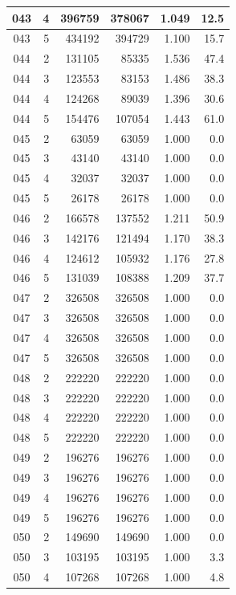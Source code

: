 \begin{longtable}{|c|r|r|r|r|r|}
\hline
043 & 4 & 396759 & 378067 & 1.049 & 12.5 \\
\hline
043 & 5 & 434192 & 394729 & 1.100 & 15.7 \\
\hline
044 & 2 & 131105 & 85335 & 1.536 & 47.4 \\
\hline
044 & 3 & 123553 & 83153 & 1.486 & 38.3 \\
\hline
044 & 4 & 124268 & 89039 & 1.396 & 30.6 \\
\hline
044 & 5 & 154476 & 107054 & 1.443 & 61.0 \\
\hline
045 & 2 & 63059 & 63059 & 1.000 & 0.0 \\
\hline
045 & 3 & 43140 & 43140 & 1.000 & 0.0 \\
\hline
045 & 4 & 32037 & 32037 & 1.000 & 0.0 \\
\hline
045 & 5 & 26178 & 26178 & 1.000 & 0.0 \\
\hline
046 & 2 & 166578 & 137552 & 1.211 & 50.9 \\
\hline
046 & 3 & 142176 & 121494 & 1.170 & 38.3 \\
\hline
046 & 4 & 124612 & 105932 & 1.176 & 27.8 \\
\hline
046 & 5 & 131039 & 108388 & 1.209 & 37.7 \\
\hline
047 & 2 & 326508 & 326508 & 1.000 & 0.0 \\
\hline
047 & 3 & 326508 & 326508 & 1.000 & 0.0 \\
\hline
047 & 4 & 326508 & 326508 & 1.000 & 0.0 \\
\hline
047 & 5 & 326508 & 326508 & 1.000 & 0.0 \\
\hline
048 & 2 & 222220 & 222220 & 1.000 & 0.0 \\
\hline
048 & 3 & 222220 & 222220 & 1.000 & 0.0 \\
\hline
048 & 4 & 222220 & 222220 & 1.000 & 0.0 \\
\hline
048 & 5 & 222220 & 222220 & 1.000 & 0.0 \\
\hline
049 & 2 & 196276 & 196276 & 1.000 & 0.0 \\
\hline
049 & 3 & 196276 & 196276 & 1.000 & 0.0 \\
\hline
049 & 4 & 196276 & 196276 & 1.000 & 0.0 \\
\hline
049 & 5 & 196276 & 196276 & 1.000 & 0.0 \\
\hline
050 & 2 & 149690 & 149690 & 1.000 & 0.0 \\
\hline
050 & 3 & 103195 & 103195 & 1.000 & 3.3 \\
\hline
050 & 4 & 107268 & 107268 & 1.000 & 4.8 \\

\end{longtable}
